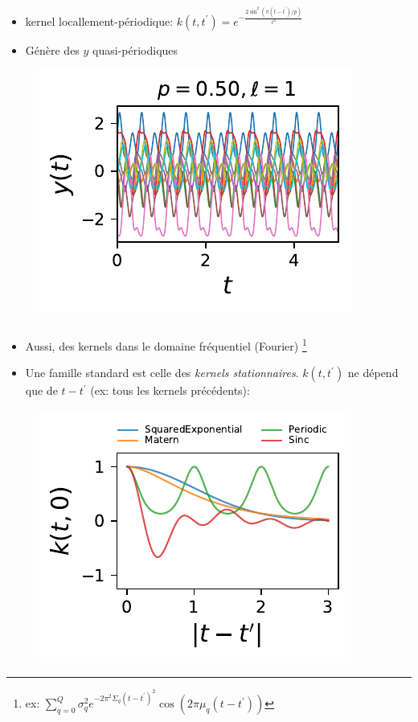 \documentclass[xcolor=svgnames, t]{beamer}
\newcommand{\coloredemph}[1]{\textcolor{internationalblue}{\emph{#1}}}
\begin{document}
\begin{frame}
  \frametitle{\secname}
  \begin{itemize}
    \item kernel locallement-périodique:
    $k (t, t^\prime) = e^{- \frac{2 \sin^2(\pi (t - t^\prime) / p)}{\ell^2}}$ %
    \item Génère des $y$ quasi-périodiques
  \end{itemize}
  \begin{figure}
    \includegraphics{10_gp_time_PeriodicKernel_0.50.pdf}
  \end{figure}
\end{frame}

% 
\begin{frame}
  \frametitle{\secname}
  \begin{itemize}
    \item Aussi, des kernels dans le domaine fréquentiel (Fourier)
    \footnote{ex: $\sum_{q=0}^Q \sigma_q^2 e^{-2 \pi^2 \Sigma_q (t-t^\prime)^2} \cos(2\pi \mu_q (t-t^\prime))$}
  \pause
    \item Une famille standard est celle des \coloredemph{kernels stationnaires}. 
    $k(t, t^\prime)$ ne dépend que de $t - t^\prime$ (ex: tous les kernels précédents):
  \end{itemize}
  \begin{figure}
    \includegraphics[scale=0.80]{autocov_gp_1D.pdf}
  \end{figure}
\end{frame}
\end{document}
